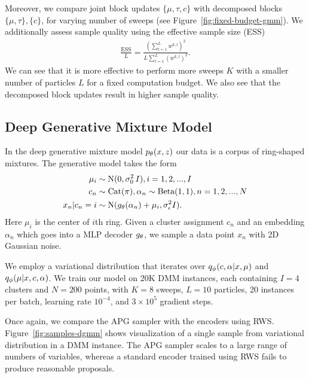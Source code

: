 \documentclass{article}
\theoremstyle{definition}
\begin{document}
Moreover, we compare joint block updates $\{\mu, \tau, c\}$ with decomposed blocks $\{\mu, \tau\}, \{c\}$, for varying number of sweeps (see Figure~\ref{fig:fixed-budget-gmm}). %
We additionally assess sample quality using the effective sample size (ESS)
\begin{align*}
    \frac{\text{ESS}}{L} 
    = 
    \frac{(\sum_{l=1}^L w^{k,l})^2}
         {L \sum_{l=1}^L (w^{k,l})^2}
    .
\end{align*}
We can see that it is more effective to perform more sweeps $K$ with a smaller number of particles $L$ for a fixed computation budget. We also see that the decomposed block updates result in higher sample quality.


\subsection{Deep Generative Mixture Model}
In the deep generative mixture model $p_\theta(x, z)$ our data is a corpus of ring-shaped mixtures. The generative model takes the form
\begin{align*}
    \mu_i &\sim \text{N}(0, 
    \sigma_0^2 \, I), 
    i = 1, 2, ..., I \\
    c_n &\sim \mathrm{Cat}(\pi), \alpha_n \sim \text{Beta}(1, 1), n = 1, 2, ..., N \\
    x_n | c_n=i &\sim \text{N}(g_\theta(\alpha_n) + \mu_i, \sigma^2_{\epsilon} I).
\end{align*}
Here $\mu_i$ is the center of $i$th ring. Given a cluster assignment $c_n$ and an embedding $\alpha_n$ which goes into a MLP decoder $g_\theta$, we sample a data point $x_n$ with 2D Gaussian noise. 

We employ a variational distribution that iterates over  $q_\phi(c, \alpha | x, \mu)$ and $q_\phi(\mu | x, c, \alpha)$. We train our model on 20K DMM instances, each containing $I = 4$ clusters and $N=200$ points, with $K=8$ sweeps, $L=10$ particles, 20 instances per batch, learning rate $10^{-4}$, and $3\times10^5$ gradient steps.

Once again, we compare the APG sampler with the encoders using RWS. Figure~\ref{fig:samples-dgmm} shows visualization of a single sample from variational distribution in a DMM instance. The APG sampler scales to a large range of numbers of variables, whereas a standard encoder trained using RWS fails to produce reasonable proposals.
\end{document}
